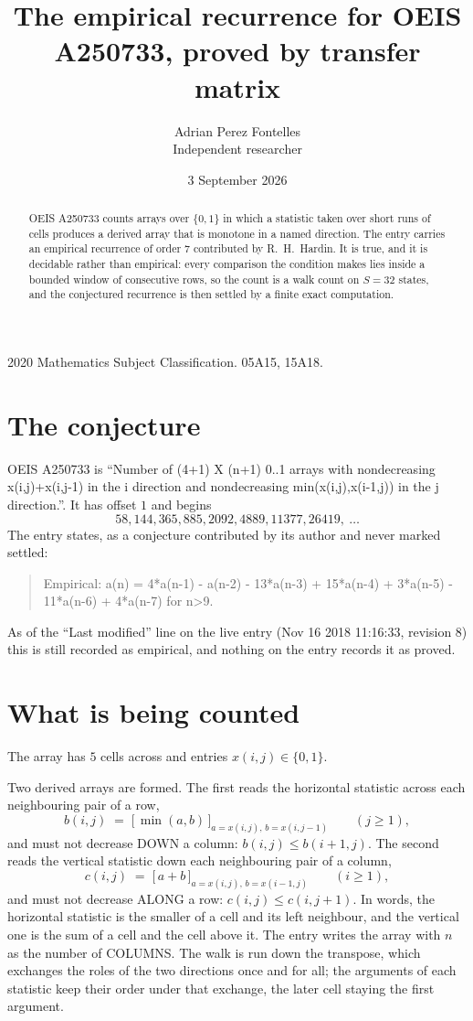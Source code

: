 \documentclass[11pt,a4paper]{article}
\title{The empirical recurrence for OEIS A250733, proved by transfer matrix}
\author{Adrian Perez Fontelles\\ \small Independent researcher}
\date{3 September 2026}
\theoremstyle{plain}
\theoremstyle{definition}
\begin{document}
\maketitle

\begin{abstract}
OEIS A250733 counts arrays over $\{0,1\}$ in which a statistic taken over short runs
of cells produces a derived array that is monotone in a named direction. The entry carries an
empirical recurrence of order $7$ contributed by R.~H.~Hardin. It is true, and it is
decidable rather than empirical: every comparison the condition makes lies inside a bounded
window of consecutive rows, so the count is a walk count on $S=32$ states, and the
conjectured recurrence is then settled by a finite exact computation.
\end{abstract}

\noindent\small 2020 Mathematics Subject Classification. 05A15, 15A18.\normalsize

\section{The conjecture}

OEIS A250733 is ``Number of (4+1) X (n+1) 0..1 arrays with nondecreasing x(i,j)+x(i,j-1) in the i direction and nondecreasing min(x(i,j),x(i-1,j)) in the j direction.''. It has offset $1$ and begins
\[
58, 144, 365, 885, 2092, 4889, 11377, 26419,\ \dots
\]
The entry states, as a conjecture contributed by its author and never marked settled:
\begin{quote}
Empirical: a(n) = 4*a(n-1) - a(n-2) - 13*a(n-3) + 15*a(n-4) + 3*a(n-5) - 11*a(n-6) + 4*a(n-7) for n>9.
\end{quote}
As of the ``Last modified'' line on the live entry (Nov 16 2018 11:16:33, revision 8) this is still
recorded as empirical, and nothing on the entry records it as proved.

\section{What is being counted}

The array has $5$ cells across and entries $x(i,j)\in\{0,1\}$.

Two derived arrays are formed. The first reads the horizontal statistic across each
neighbouring pair of a row,
\[
b(i,j)\;=\;\bigl[\,\min(a,b)\,\bigr]_{a=x(i,j),\,b=x(i,j-1)}\qquad (j\ge1),
\]
and must not decrease DOWN a column: $b(i,j)\le b(i{+}1,j)$. The second reads the vertical
statistic down each neighbouring pair of a column,
\[
c(i,j)\;=\;\bigl[\,a+b\,\bigr]_{a=x(i,j),\,b=x(i{-}1,j)}\qquad (i\ge1),
\]
and must not decrease ALONG a row: $c(i,j)\le c(i,j{+}1)$. In words, the horizontal statistic
is the smaller of a cell and its left neighbour, and the vertical one is
the sum of a cell and the cell above it. The entry writes the array with $n$ as the number of COLUMNS. The walk is run down the transpose, which exchanges the roles of the two directions once and for all; the arguments of each statistic keep their order under that exchange, the later cell staying the first argument.
\end{document}
